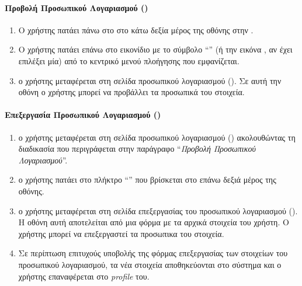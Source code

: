 \paragraph{Προβολή Προσωπικού Λογαριασμού (\textit{})}
\begin{enumerate}
     \item Ο χρήστης πατάει πάνω στο  στο κάτω δεξία μέρος της οθόνης στην .
    \item Ο χρήστης πατάει επάνω στο εικονίδιο με το σύμβολο ``\textit{}'' (ή την εικόνα , αν έχει επιλέξει μία) από το κεντρικό μενού πλοήγησης που εμφανίζεται.
    \item ο χρήστης μεταφέρεται στη σελίδα προσωπικού λογαριασμού (\textit{}). Σε αυτή την οθόνη ο χρήστης μπορεί να προβάλλει τα προσωπικά του στοιχεία.
\end{enumerate}

\paragraph{Επεξεργασία Προσωπικού Λογαριασμού ()}
\begin{enumerate}
     \item ο χρήστης μεταφέρεται στη σελίδα προσωπικού λογαριασμού (\textit{}) ακολουθώντας τη διαδικασία που περιγράφεται στην παράγραφο ``\textit{Προβολή Προσωπικού Λογαριασμού}''.
    \item ο χρήστης πατάει στο πλήκτρο ``\textit{}'' που βρίσκεται στο επάνω δεξιά μέρος της οθόνης.
    \item ο χρήστης μεταφέρεται στη σελίδα επεξεργασίας του προσωπικού λογαριασμού (\textit{}). Η οθόνη αυτή αποτελείται από μια φόρμα με τα αρχικά στοιχεία του χρήστη. Ο χρήστης μπορεί να επεξεργαστεί τα προσωπικα του στοιχεία.
    \item Σε περίπτωση επιτυχούς υποβολής της φόρμας επεξεργασίας των στοιχείων του προσωπικού λογαριασμού, τα νέα στοιχεία αποθηκεύονται στο σύστημα και ο χρήστης επαναφέρεται στο \textit{profile} του.
\end{enumerate}

